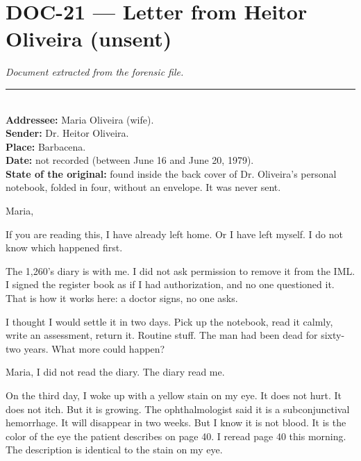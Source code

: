 \section*{\textbf{DOC-21} --- Letter from Heitor Oliveira (unsent)}

\noindent \textit{Document extracted from the forensic file.}

\vspace{0.5em}\noindent\rule{\textwidth}{0.5pt}\vspace{0.5em}

\\[-0.2em]

\noindent \textbf{Addressee:} Maria Oliveira (wife).\\
\noindent \textbf{Sender:} Dr. Heitor Oliveira.\\
\noindent \textbf{Place:} Barbacena.\\
\noindent\textbf{Date:} not recorded (between June 16 and June 20, 1979).\\
\noindent\textbf{State of the original:} found inside the back cover of Dr. Oliveira's personal notebook, folded in four, without an envelope. It was never sent.

\noindent Maria,

\noindent If you are reading this, I have already left home. Or I have left
\noindent myself. I do not know which
\noindent happened first.

\noindent The 1,260's diary is with me. I did not ask permission to remove it
\noindent from the IML. I signed the register book as if I had authorization, and no one
\noindent questioned it. That is how it works here: a doctor signs, no one asks.

\noindent I thought I would settle it in two days. Pick up the notebook, read it calmly,
\noindent write an assessment, return it. Routine stuff. The man had been dead for
\noindent sixty-two years. What more could happen?

\noindent Maria, I did not read the diary. The diary read me.

\noindent On the third day, I woke up with a yellow stain on my eye. It does not hurt.
\noindent It does not itch. But it is growing. The ophthalmologist said it is a
\noindent subconjunctival hemorrhage. It will disappear in two weeks. But I know it is not
\noindent blood. It is the color of the eye the patient describes on page 40. I reread
\noindent page 40 this morning. The description is identical to the stain on my eye.

